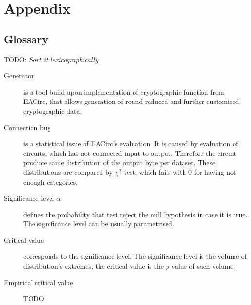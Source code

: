 \documentclass[
  print, %
  Table,   %
  nolof,     %
  nolot,     %
  11pt, %
  oneside  %
]{fithesis3}
\newcommand{\todo}[1]{TODO: \textit{#1}}
\begin{document}
\printbibliography[heading=bibintoc] %

\chapter*{Appendix}
\label{chap:app}

\section{Glossary}
\label{sec:app-glos}

\todo{Sort it lexicographically}

\begin{description}
    \item[Generator] is a tool build upon implementation of cryptographic function from EACirc, that allows generation of round-reduced and further customised cryptographic data.
    \item[Connection bug] is a statistical issue of EACirc's evaluation. It is caused by evaluation of circuits, which has not connected input to output. Therefore the circuit produce same distribution of the output byte per dataset. These distributions are compared by $\chi^{2}$ test, which fails with 0 for having not enough categories.
    \item[Significance level $\alpha$] defines the probability that test reject the null hypothesis in case it is true. The significance level can be usually parametrised.
    \item[Critical value] corresponds to the significance level. The significance level is the volume of distribution's extremes, the critical value is the $p$-value of such volume.
    \item[Empirical critical value] TODO
    

\end{description}
\end{document}
